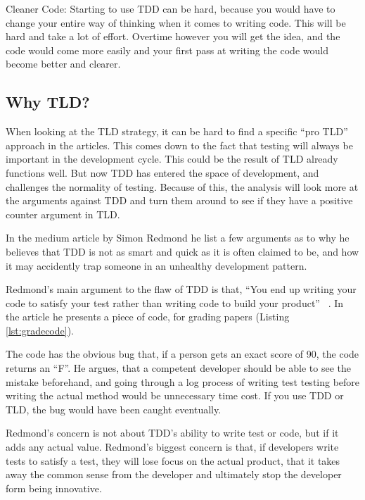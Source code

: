Cleaner Code:
Starting to use TDD can be hard, because you would have to change your entire way of thinking when it comes to writing code. This will be hard and take a lot of effort. Overtime however you will get the idea, and the code would come more easily and your first pass at writing the code would become better and clearer.



\subsection{Why TLD?}
When looking at the TLD strategy, it can be hard to find a specific “pro TLD” approach in the articles. This comes down to the fact that testing will always be important in the development cycle. This could be the result of TLD already functions well. But now TDD has entered the space of development, and challenges the normality of testing. Because of this, the analysis will look more at the arguments against TDD and turn them around to see if they have a positive counter argument in TLD. 
 
In the medium article by Simon Redmond he list a few arguments as to why he believes that TDD is not as smart and quick as it is often claimed to be, and how it may accidently trap someone in an unhealthy development pattern. 
 
Redmond’s main argument to the flaw of TDD is that,  “You end up writing your code to satisfy your test rather than writing code to build your product” ~\cite{sr2019}. In the article he presents a piece of code, for grading papers (Listing \ref{lst:gradecode}). 
\newline


The code has the obvious bug that, if a person gets an exact score of 90, the code returns an “F”. He argues, that a competent developer should be able to see the mistake beforehand, and going through a log process of writing test testing before writing the actual method would be unnecessary time cost. If you use TDD or TLD, the bug would have been caught eventually.
 
Redmond’s concern is not about TDD’s ability to write test or code, but if it adds any actual value. Redmond’s biggest concern is that, if developers write tests to satisfy a test, they will lose focus on the actual product, that it takes away the common sense from the developer and ultimately stop the developer form being innovative.\newline  


